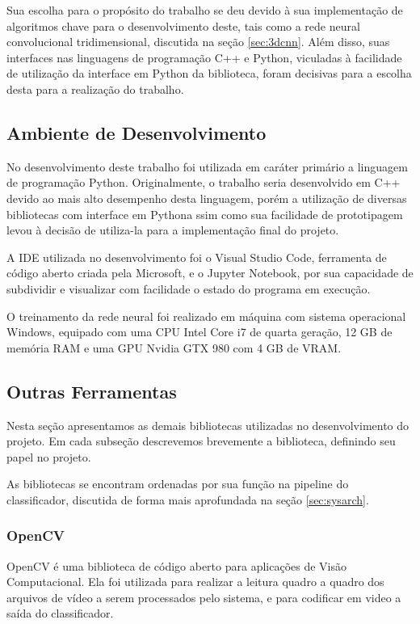 Sua escolha para o propósito do trabalho se deu devido à sua implementação de algoritmos chave para o desenvolvimento deste, tais como a rede neural convolucional tridimensional, discutida na seção \ref{sec:3dcnn}. Além disso, suas interfaces nas linguagens de programação C++ e Python, viculadas à facilidade de utilização da interface em Python da biblioteca, foram decisivas para a escolha desta para a realização do trabalho.

\subsection{Ambiente de Desenvolvimento}
\label{subsec:environ}

No desenvolvimento deste trabalho foi utilizada em caráter primário a linguagem de programação Python. Originalmente, o trabalho seria desenvolvido em C++ devido ao mais alto desempenho desta linguagem, porém a utilização de diversas bibliotecas com interface em Pythona ssim como sua facilidade de prototipagem levou à decisão de utiliza-la para a implementação final do projeto.

A IDE utilizada no desenvolvimento foi o Visual Studio Code, ferramenta de código aberto criada pela Microsoft, e o Jupyter Notebook\cite{Kluyver:2016aa}, por sua capacidade de subdividir e visualizar com facilidade o estado do programa em execução.

O treinamento da rede neural foi realizado em máquina com sistema operacional Windows, equipado com uma CPU Intel Core i7 de quarta geração, 12 GB de memória RAM e uma GPU Nvidia GTX 980 com 4 GB de VRAM.

\subsection{Outras Ferramentas}
\label{subsec:otools}

Nesta seção apresentamos as demais bibliotecas utilizadas no desenvolvimento do projeto. Em cada subseção descrevemos brevemente a biblioteca, definindo seu papel no projeto.

As bibliotecas se encontram ordenadas por sua função na pipeline do classificador, discutida de forma mais aprofundada na seção \ref{sec:sysarch}.

\subsubsection{OpenCV}

OpenCV\cite{opencv_library} é uma biblioteca de código aberto para aplicações de Visão Computacional. Ela foi utilizada para realizar a leitura quadro a quadro dos arquivos de vídeo a serem processados pelo sistema, e para codificar em video a saída do classificador.

